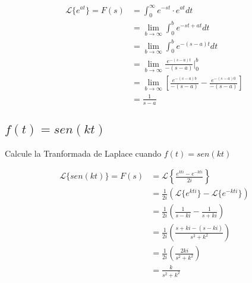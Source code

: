 \documentclass[12pt]{report}                                %
\begin{document}
            \begin{equation*}   
            \begin{split}
                \mathscr{L}\{e^{at}\}
                    = F(s) & = \int_0^\infty e^{-st} \cdot e^{at} dt                                                 \\
                    & = \lim_{b \to \infty} \int_0^b e^{-st+at} dt                                                   \\
                    & = \lim_{b \to \infty} \int_0^b e^{-(s-a)t} dt                                                  \\
                    & = \lim_{b \to \infty} \frac{e^{-(s-a)t}}{-(s-a)} |_0^b                                         \\
                    & = \lim_{b \to \infty} \left[ \frac{e^{-(s-a)b}}{-(s-a)} -  \frac{e^{-(s-a)0}}{-(s-a)} \right]  \\
                    & = \frac{1}{s-a}
            \end{split}
            \end{equation*}


        \subsection{$f(t) = sen(kt)$}
            Calcule la Tranformada de Laplace cuando $f(t) = sen(kt)$

            \begin{equation*}   
            \begin{split}
                \mathscr{L}\{sen(kt)\}
                    = F(s) & = \mathscr{L}\left\{ \frac{e^{kti} - e^{-kti}}{2i} \right\}             \\
                    & = \frac{1}{2i} \left(\mathscr{L}\{e^{kti}\}-\mathscr{L}\{e^{-kti}\}\right)     \\
                    & = \frac{1}{2i} \left( \frac{1}{s-ki} - \frac{1}{s+ki} \right)                  \\
                    & = \frac{1}{2i} \left( \frac{s+ki -(s-ki)}{s^2+k^2} \right)                     \\
                    & = \frac{1}{2i} \left( \frac{2ki}{s^2+k^2} \right)                              \\
                    & = \frac{k}{s^2+k^2} \\
            \end{split}
            \end{equation*}
\end{document}
